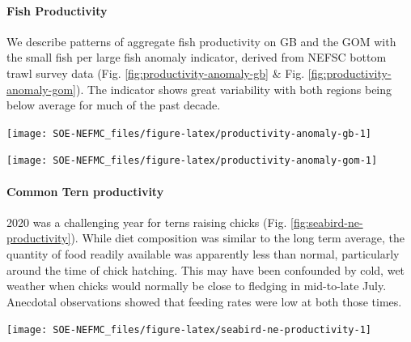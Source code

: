 \documentclass[
  10pt,
]{article}
\let\origfigure\figure
\let\endorigfigure\endfigure
\renewenvironment{figure}[1][2] {
    \expandafter\origfigure\expandafter[H]
} {
    \endorigfigure
}
\begin{document}
\hypertarget{fish-productivity}{%
\paragraph{Fish Productivity}\label{fish-productivity}}

We describe patterns of aggregate fish productivity on GB and the GOM with the small fish per large fish anomaly indicator, derived from NEFSC bottom trawl survey data (Fig. \ref{fig:productivity-anomaly-gb} \& Fig. \ref{fig:productivity-anomaly-gom}). The indicator shows great variability with both regions being below average for much of the past decade.

\begin{figure}

{\centering \texttt{[image: SOE-NEFMC\_files/figure-latex/productivity-anomaly-gb-1]} 

}

\caption{Small fish per large fish biomass anomaly on Georges Bank. The summed anomaly across species is shown by the black line.}\label{fig:productivity-anomaly-gb}
\end{figure}

\begin{figure}

{\centering \texttt{[image: SOE-NEFMC\_files/figure-latex/productivity-anomaly-gom-1]} 

}

\caption{Small fish per large fish biomass anomaly in the Gulf of Maine. The summed anomaly across species is shown by the black line.}\label{fig:productivity-anomaly-gom}
\end{figure}

\hypertarget{common-tern-productivity}{%
\paragraph{Common Tern productivity}\label{common-tern-productivity}}

2020 was a challenging year for terns raising chicks (Fig. \ref{fig:seabird-ne-productivity}). While diet composition was similar to the long term average, the quantity of food readily available was apparently less than normal, particularly around the time of chick hatching. This may have been confounded by cold, wet weather when chicks would normally be close to fledging in mid-to-late July. Anecdotal observations showed that feeding rates were low at both those times.

\begin{figure}

{\centering \texttt{[image: SOE-NEFMC\_files/figure-latex/seabird-ne-productivity-1]} 

}

\caption{Productivity of Common terns in the Gulf of Maine.}\label{fig:seabird-ne-productivity}
\end{figure}
\end{document}

